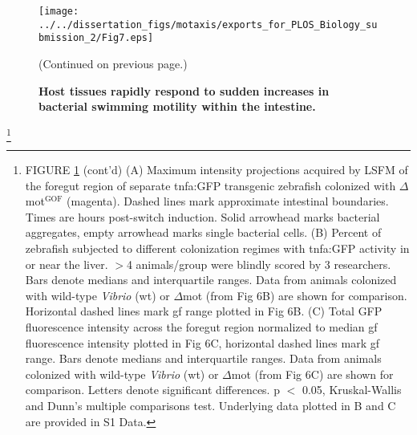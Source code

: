 {{{{{{\begin{figure}%
	\centerline{
		\texttt{[image: ../../dissertation\_figs/motaxis/exports\_for\_PLOS\_Biology\_submission\_2/Fig7.eps]}}
	\caption{\textbf{Host tissues rapidly respond to sudden increases in bacterial swimming motility within the intestine.}}{(Continued on previous page.)}
	\label{fig:motaxis_fig7}
\end{figure}

{\let\thefootnote\relax\footnote{FIGURE \ref{fig:motaxis_fig7} (cont'd) (A) Maximum intensity projections acquired by LSFM of the foregut region of separate tnfa:GFP transgenic zebrafish colonized with $\Delta$mot$^{\text{GOF}}$ (magenta). Dashed lines mark approximate intestinal boundaries. Times are hours post-switch induction. Solid arrowhead marks bacterial aggregates, empty arrowhead marks single bacterial cells. (B) Percent of zebrafish subjected to different colonization regimes with tnfa:GFP activity in or near the liver. $ > $4 animals/group were blindly scored by 3 researchers. Bars denote medians and interquartile ranges. Data from animals colonized with wild-type \textit{Vibrio} (wt) or $\Delta$mot (from Fig 6B) are shown for comparison. Horizontal dashed lines mark gf range plotted in Fig 6B. (C) Total GFP fluorescence intensity across the foregut region normalized to median gf fluorescence intensity plotted in Fig 6C, horizontal dashed lines mark gf range. Bars denote medians and interquartile ranges. Data from animals colonized with wild-type \textit{Vibrio} (wt) or $\Delta$mot (from Fig 6C) are shown for comparison. Letters denote significant differences. p $ < $ 0.05, Kruskal-Wallis and Dunn's multiple comparisons test. Underlying data plotted in B and C are provided in S1 Data.}

}}}}}}}
